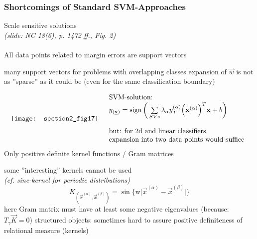 \subsubsection{Shortcomings of Standard SVM-Approaches}
Scale sensitive solutions\\
{\it (slide: NC 18(6), p. 1472 ff., Fig. 2)}
\\\\
All data points related to margin errors are support vectors
\begin{itemize}
	\itR many support vectors for problems with overlapping classes
	\itR expansion of $\vec{w}$ is not as ''sparse'' as it could be (even
		for the same classification boundary)
\end{itemize}
\[ \begin{array}{ll}
	\texttt{[image: section2\_fig17]}
	& \begin{array}{l}
		\text{SVM-solution:} \\
		y_{(\underline{\mathbf{x}})} = \operatorname{sign} \bigg( \sum\limits_{SVs} \lambda_\alpha
			y_T^{(\alpha)} \Big( \underline{\mathbf{x}}^{(\alpha)} \Big)^T 
			\underline{\mathbf{x}} + b \bigg) \\\\
		\text{but: for 2d and linear classifiers} \\
		\text{expansion into two data points would suffice}
	\end{array}
\end{array} \]
Only positive definite kernel functions / Gram matrices
\begin{itemize}
	\itR some ''interesting'' kernels cannot be used \\
		{\it (cf. sine-kernel for periodic distributions)}
		\[ K_{(\vec{x}^{(\alpha)}, \vec{x}^{(\beta)})} 
			= \sin \Big\{ \mathrm{w} \Big| 
			\vec{x}^{(\alpha)} - \vec{x}^{(\beta)} \Big| \Big\}
		\]
		here Gram matrix must have at least some negative eigenvalues
		(because: $T_\gamma \vec{K} = 0$)
	\itR structured objects: sometimes hard to assure positive definiteness
		of relational measure (kernels)
\end{itemize}


